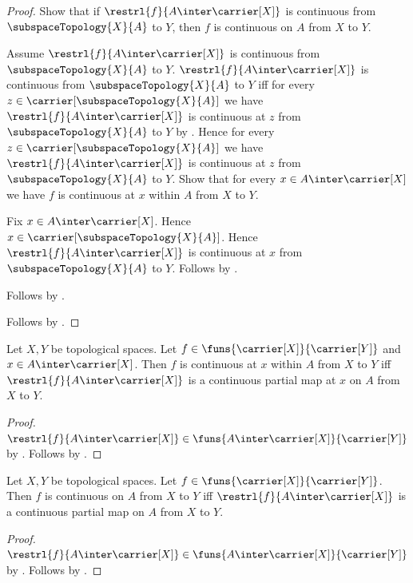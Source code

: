 \begin{proof}
    Show that if $\restrl{f}{A\inter\carrier[X]}$ is continuous from
        $\subspaceTopology{X}{A}$ to $Y$, then
        $f$ is continuous on $A$ from $X$ to $Y$.
    \begin{subproof}
        Assume $\restrl{f}{A\inter\carrier[X]}$ is continuous from
            $\subspaceTopology{X}{A}$ to $Y$.
        $\restrl{f}{A\inter\carrier[X]}$ is continuous from
            $\subspaceTopology{X}{A}$ to $Y$ iff for every
            $z\in\carrier[\subspaceTopology{X}{A}]$ we have
            $\restrl{f}{A\inter\carrier[X]}$ is continuous at $z$ from
            $\subspaceTopology{X}{A}$ to $Y$ by
            .
        Hence for every $z\in\carrier[\subspaceTopology{X}{A}]$ we have
            $\restrl{f}{A\inter\carrier[X]}$ is continuous at $z$ from
            $\subspaceTopology{X}{A}$ to $Y$.
        Show that for every $x\in A\inter\carrier[X]$ we have
            $f$ is continuous at $x$ within $A$ from $X$ to $Y$.
        \begin{subproof}
            Fix $x\in A\inter\carrier[X]$.
            Hence $x\in\carrier[\subspaceTopology{X}{A}]$.
            Hence $\restrl{f}{A\inter\carrier[X]}$ is continuous at $x$
                from $\subspaceTopology{X}{A}$ to $Y$.
            Follows by
                .
        \end{subproof}
        Follows by .
    \end{subproof}
    Follows by \auto.
\end{proof}

\begin{corollary}\label{continuous_at_within_iff_restriction_continuous_as_map_on}
    Let $X,Y$ be topological spaces.
    Let $f\in\funs{\carrier[X]}{\carrier[Y]}$ and
        $x\in A\inter\carrier[X]$.
    Then $f$ is continuous at $x$ within $A$ from $X$ to $Y$ iff
        $\restrl{f}{A\inter\carrier[X]}$ is a continuous partial map at
            $x$ on $A$ from $X$ to $Y$.
\end{corollary}
\begin{proof}
    $\restrl{f}{A\inter\carrier[X]}
        \in\funs{A\inter\carrier[X]}{\carrier[Y]}$ by
        .
    Follows by
        .
\end{proof}

\begin{corollary}\label{continuous_on_iff_restriction_continuous_as_map_on}
    Let $X,Y$ be topological spaces.
    Let $f\in\funs{\carrier[X]}{\carrier[Y]}$.
    Then $f$ is continuous on $A$ from $X$ to $Y$ iff
        $\restrl{f}{A\inter\carrier[X]}$ is a continuous partial map on
            $A$ from $X$ to $Y$.
\end{corollary}
\begin{proof}
    $\restrl{f}{A\inter\carrier[X]}
        \in\funs{A\inter\carrier[X]}{\carrier[Y]}$ by
        .
    Follows by
        .
\end{proof}
